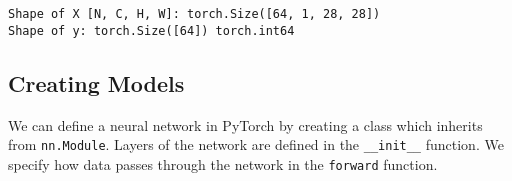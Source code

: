 \documentclass[11pt]{article}
\begin{document}
    \begin{Verbatim}[commandchars=\\\{\}]
Shape of X [N, C, H, W]: torch.Size([64, 1, 28, 28])
Shape of y: torch.Size([64]) torch.int64
    \end{Verbatim}

    \subsection{Creating Models}\label{creating-models}

    We can define a neural network in PyTorch by creating a class which
inherits from \texttt{nn.Module}. Layers of the network are defined in
the \texttt{\_\_init\_\_} function. We specify how data passes through
the network in the \texttt{forward} function.
\end{document}
